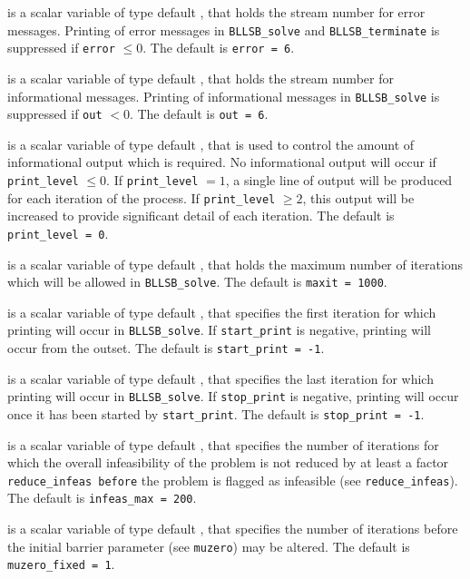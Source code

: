 \documentclass{galahad}
\newcommand{\packagename}{BLLSB}
\begin{document}
\begin{description}

 is a scalar variable of type default \integer, that holds the
stream number for error messages. Printing of error messages in
{\tt \packagename\_solve} and {\tt \packagename\_terminate} is suppressed if
{\tt error} $\leq 0$.
The default is {\tt error = 6}.

 is a scalar variable of type default \integer, that holds the
stream number for informational messages. Printing of informational messages in
{\tt \packagename\_solve} is suppressed if {\tt out} $< 0$.
The default is {\tt out = 6}.

 is a scalar variable of type default \integer, that is used
to control the amount of informational output which is required. No
informational output will occur if {\tt print\_level} $\leq 0$. If
{\tt print\_level} $= 1$, a single line of output will be produced for each
iteration of the process. If {\tt print\_level} $\geq 2$, this output will be
increased to provide significant detail of each iteration.
The default is {\tt print\_level = 0}.

 is a scalar variable of type default \integer, that holds the
maximum number of iterations which will be allowed in {\tt \packagename\_solve}.
The default is {\tt maxit = 1000}.

 is a scalar variable of type default \integer, that specifies
the first iteration for which printing will occur in {\tt \packagename\_solve}.
If {\tt start\_print} is negative, printing will occur from the outset.
The default is {\tt start\_print = -1}.

 is a scalar variable of type default \integer, that specifies
the last iteration for which printing will occur in  {\tt \packagename\_solve}.
If {\tt stop\_print} is negative, printing will occur once it has been
started by {\tt start\_print}.
The default is {\tt stop\_print = -1}.

 is a scalar variable of type default \integer, that specifies
the number of iterations for which the overall infeasibility
of the problem is not reduced by at least a factor {\tt reduce\_infeas
before} the problem is flagged as infeasible (see {\tt reduce\_infeas}).
The default is {\tt infeas\_max = 200}.

 is a scalar variable of type default \integer,
that specifies
the number of iterations before the initial barrier parameter
(see {\tt muzero}) may be altered.
The default is {\tt muzero\_fixed = 1}.


\end{description}
\end{document}
